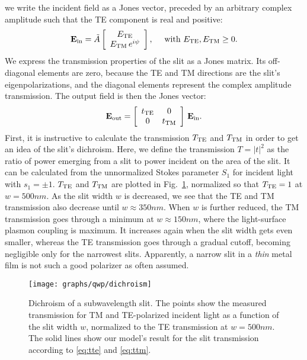  we write the incident field as a Jones vector, preceded by an arbitrary complex amplitude such that the \gls{TE} component is real and positive:
%
\begin{equation}
\mathbf{E_\text{in}} = \tilde{A} \left[
	\begin{array}{c}
		E_{\text{TE}} \\
		E_{\text{TM}}\, e^{i\psi}
	\end{array}
\right], \quad
\text{ with $E_{\text{TE}}, E_{\text{TM}} \geq 0$.}
\label{qwp:eq:incident-jones-vector}
\end{equation}
%
%
We express the transmission properties of the slit as a Jones matrix.
Its off-diagonal elements are zero, because the \gls{TE} and \gls{TM} directions are the slit's eigenpolarizations, and the diagonal elements represent the complex amplitude transmission.
The output field is then the Jones vector:
%
\begin{equation}
\mathbf{E}_\text{out} = \left[
	\begin{array}{cc}
		t_{\text{TE}} & 0 \\
		0 & t_{\text{TM}}
	\end{array}
\right]
\,\mathbf{E_\text{in}}.
\label{Eq:analyzer0}
\end{equation}
%
%
First, it is instructive to calculate the transmission $T_{\text{TE}}$ and $T_{\text{TM}}$ in order to get an idea of the slit's dichroism.
Here, we define the transmission $T=|t|^2$ as the ratio of power emerging from a slit to power incident on the area of the slit.
It can be calculated from the unnormalized Stokes parameter $S_1$ for incident light with $s_1=\pm 1$.
$T_{\text{TE}}$ and $T_{\text{TM}}$ are plotted in Fig.~\ref{qwp:fig:dichroism}, normalized so that $T_{\text{TE}} = 1$ at $w=500\unit{nm}$.
As the slit width $w$ is decreased, we see that the \gls{TE} and \gls{TM} transmission also decrease until $w\approx 350\unit{nm}$.
When $w$ is further reduced, the \gls{TM} transmission goes through a minimum at $w\approx 150\unit{nm}$, where the light-surface plasmon coupling is maximum.\cite{Lalanne2006}
It increases again when the slit width gets even smaller, whereas the \gls{TE} transmission goes through a gradual cutoff, becoming negligible only for the narrowest slits.
Apparently, a narrow slit in a \emph{thin} metal film is not such a good polarizer as often assumed.
%
\begin{figure}[tb]
\forcerectofloat\centering
\texttt{[image: graphs/qwp/dichroism]}
\caption{Dichroism of a subwavelength slit.
The points show the measured transmission for \gls{TM} and \gls{TE}-polarized incident light as a function of the slit width $w$, normalized to the \gls{TE} transmission at $w=500\unit{nm}$.
The solid lines show our model's result for the slit transmission according to \eqref{eq:tte} and \eqref{eq:ttm}.}
\label{qwp:fig:dichroism}
\end{figure}


